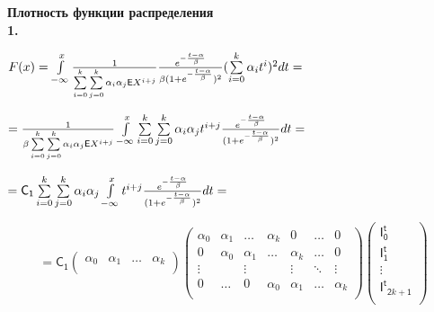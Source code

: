 \documentclass[a4paper,12pt]{article}
\begin{document}
\noindent\textbf{Плотность функции распределения}\\

\noindent\textbf{1.}

\begin{center}
$F(x) = \int\limits_{-\infty}^x {1\over{\sum\limits_{i = 0}^k}\sum\limits_{j=0}^k\alpha_i \alpha_j \mathsf{E}X^{i + j}} {e^{-{t - \alpha\over{\beta}}}\over{\beta(1 + e^{-{t - \alpha\over{\beta}}}})^2}(\sum\limits_{i = 0}^k \alpha_i t^i)^2 d t =$
\end{center}

\begin{center}
$= {1\over{\beta\sum\limits_{i = 0}^k}\sum\limits_{j=0}^k\alpha_i \alpha_j \mathsf{E}X^{i + j}} \int\limits_{-\infty}^x \sum\limits_{i = 0}^k \sum\limits_{j = 0}^k \alpha_i \alpha_j t^{i + j} {e^{-{t - \alpha\over{\beta}}}\over{(1 + e^{-{t - \alpha\over{\beta}}}})^2} d t =$
\end{center}

\begin{center}
    $= \mathsf{C_1} \sum\limits_{i = 0}^k \sum\limits_{j = 0}^k \alpha_i \alpha_j \int\limits_{-\infty}^x t^{i + j} {e^{-{t - \alpha\over{\beta}}}\over{(1 + e^{-{t - \alpha\over{\beta}}}})^2} d t = $
\end{center}

\begin{displaymath}
    = \mathsf{C_1} \begin{pmatrix}
        \alpha_0 & \alpha_1 & \ldots & \alpha_k \\
    \end{pmatrix} \begin{pmatrix}
        \alpha_0 & \alpha_1 & \ldots & \alpha_k & 0 & \ldots & 0 \\
        0 & \alpha_0 & \alpha_1 & \ldots & \alpha_k & \ldots & 0 \\
        \vdots &  & \vdots &  & \vdots & \ddots & \vdots\\
        0 & \ldots & 0 & \alpha_0 & \alpha_1 &\ldots & \alpha_k \\
    \end{pmatrix} \begin{pmatrix}
        \mathsf{I^t_0} \\ \mathsf{I^t_1} \\ \vdots \\ \mathsf{I^t}_{\mathsf{2}k + \mathsf{1}} \\
    \end{pmatrix}
\end{displaymath}
\end{document}
